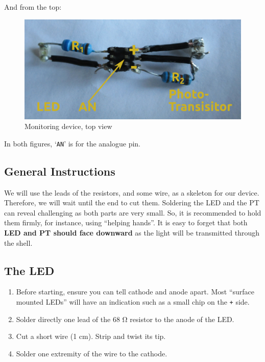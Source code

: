 \documentclass[]{article}
\begin{document}
And from the top:

\begin{figure}[htbp]
\centering
\includegraphics{./img/fig2.jpg}
\caption{Monitoring device, top view}
\end{figure}

In both figures, `\texttt{AN}' is for the analogue pin.

\subsection{General Instructions}\label{general-instructions}

We will use the leads of the resistors, and some wire, as a skeleton for
our device. Therefore, we will wait until the end to cut them. Soldering
the LED and the PT can reveal challenging as both parts are very small.
So, it is recommended to hold them firmly, for instance, using ``helping
hands''. It is easy to forget that both \textbf{LED and PT should face
downward} as the light will be transmitted through the shell.

\subsection{The LED}\label{the-led}

\begin{enumerate}
\def\labelenumi{\arabic{enumi}.}
\itemsep1pt\parskip0pt
\item
  Before starting, ensure you can tell cathode and anode apart. Most
  ``surface mounted LEDs'' will have an indication such as a small chip
  on the \texttt{+} side.
\item
  Solder directly one lead of the 68 Ω resistor to the anode of the LED.
\item
  Cut a short wire (1 cm). Strip and twist its tip.
\item
  Solder one extremity of the wire to the cathode.
\end{enumerate}
\end{document}
